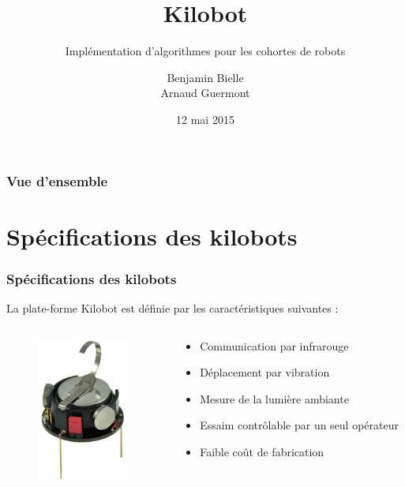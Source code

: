 \documentclass[xcolor=table]{beamer}
\title[PSAR 12 : Kilobot]{\Huge{Kilobot}}
\subtitle{Impl\'ementation d'algorithmes pour les cohortes de robots}
\author[Benjamin Bielle, Arnaud Guermont]{Benjamin Bielle\\Arnaud Guermont}
\institute{Universit\'e Pierre et Marie Curie}
\date{12 mai 2015}
\begin{document}
\begin{frame}
  \titlepage
\end{frame}

\begin{frame}
  \frametitle{Vue d'ensemble} %
  \tableofcontents %
\end{frame}

\section{Sp\'ecifications des kilobots}
\begin{frame}
  \frametitle{Sp\'ecifications des kilobots}
  La plate-forme Kilobot est définie par les caractéristiques suivantes : 
  \begin{columns}[T] %
    \begin{column}{.48\textwidth}
      \begin{figure}[!h]
        \includegraphics[width=3cm]{kilobotSpecs.jpg}
      \end{figure}
    \end{column}%
    \hfill%
    \begin{column}{.48\textwidth}
      \begin{itemize}
        \item Communication par infrarouge
        \item D\'eplacement par vibration
        \item Mesure de la lumi\`ere ambiante
        \item Essaim contr\^olable par un seul op\'erateur
        \item Faible co\^ut de fabrication
      \end{itemize}
    \end{column}%
  \end{columns}
\end{frame}
\end{document}
